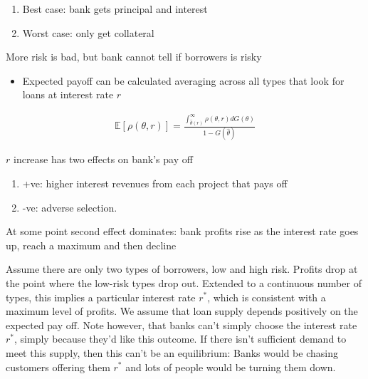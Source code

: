 \documentclass{beamer}
\begin{document}
\begin{frame}
 \begin{enumerate}
   \item Best case: bank gets principal and interest
   \item Worst case: only get collateral
 \end{enumerate}
 \medskip
 More risk is bad, but bank cannot tell if borrowers is risky
 \begin{itemize}
   \item Expected payoff can be calculated averaging across all types that look for loans at interest rate $r$
 \end{itemize}
\begin{align}
  \mathbb{E}[\rho(\theta,r)]=\frac{\int_{\hat{\theta}(r)}^{\infty}\rho(\theta,r)dG(\theta)}{1-G(\hat{\theta})}
\end{align}
\end{frame}

\begin{frame}
 $r$ increase has two effects on bank's pay off 
\begin{enumerate}
  \item +ve: higher interest revenues from each project that pays off
  \item -ve: adverse selection.   
\end{enumerate}
At some point second effect dominates: bank profits rise as the interest rate goes up, reach a maximum and then decline
\end{frame}

\begin{frame} 
  Assume there are only two types of borrowers, low and high risk. 
Profits drop at the point where the low-risk types drop out.
Extended to a continuous number of types, this implies a particular interest rate $r^*$, which is consistent with a maximum level of profits.
We assume that loan supply depends positively on the expected pay off. Note however, that banks can't simply choose the interest rate $r^*$, simply because they'd like this outcome. If there isn't sufficient demand to meet this supply, then this can't be an equilibrium: Banks would be chasing customers offering them $r^*$ and lots of people would be turning them down.
\end{frame}
\end{document}
